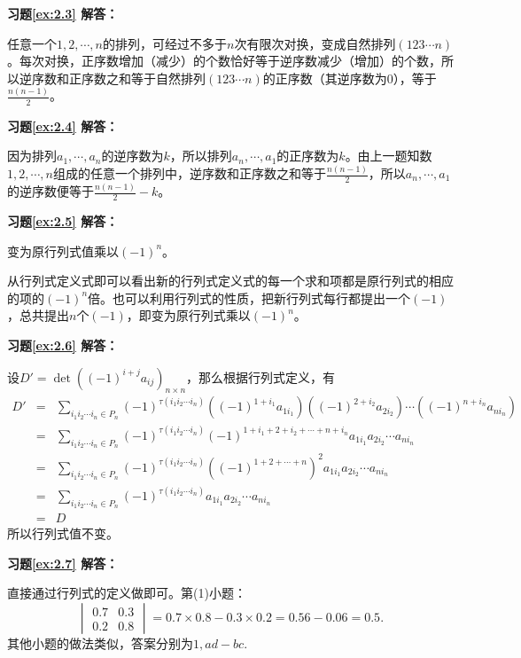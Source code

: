 \documentclass[a4paper]{book}
\begin{document}
\textbf{习题\ref{ex:2.3} 解答：}

任意一个$1,2,\cdots,n$的排列，可经过不多于$n$次有限次对换，变成自然排列$(123\cdots n)$。每次对换，正序数增加（减少）的个数恰好等于逆序数减少（增加）的个数，所以逆序数和正序数之和等于自然排列$(123\cdots n)$的正序数（其逆序数为0），等于$\frac{n(n-1)}{2}$。

\vspace{1.5em}

\textbf{习题\ref{ex:2.4} 解答：}

因为排列$a_1,\cdots,a_n$的逆序数为$k$，所以排列$a_n,\cdots,a_1$的正序数为$k$。由上一题知数$1,2,\cdots,n$组成的任意一个排列中，逆序数和正序数之和等于$\frac{n(n-1)}{2}$，所以$a_n,\cdots,a_1$ 的逆序数便等于$\frac{n(n-1)}{2}-k$。

\vspace{1.5em}

\textbf{习题\ref{ex:2.5} 解答：}

变为原行列式值乘以$(-1)^n$。

从行列式定义式即可以看出新的行列式定义式的每一个求和项都是原行列式的相应的项的$(-1)^n$倍。也可以利用行列式的性质，把新行列式每行都提出一个$(-1)$，总共提出$n$个$(-1)$，即变为原行列式乘以$(-1)^n$。

\vspace{1.5em}

\textbf{习题\ref{ex:2.6} 解答：}

设$D' = \det ((-1)^{i+j}a_{ij})_{n\times n}$，那么根据行列式定义，有
\begin{eqnarray*}
D' & = & \sum\limits_{i_1i_2\cdots i_n\in P_n} (-1)^{\tau(i_1i_2\cdots i_n)} ((-1)^{1+i_1}a_{1i_1}) ((-1)^{2+i_2}a_{2i_2}) \cdots ((-1)^{n+i_n}a_{ni_n}) \\
& = & \sum\limits_{i_1i_2\cdots i_n\in P_n} (-1)^{\tau(i_1i_2\cdots i_n)} (-1)^{1+i_1+2+i_2+\cdots+n+i_n} a_{1i_1} a_{2i_2} \cdots a_{ni_n} \\
& = & \sum\limits_{i_1i_2\cdots i_n\in P_n} (-1)^{\tau(i_1i_2\cdots i_n)} ((-1)^{1+2+\cdots+n})^2 a_{1i_1} a_{2i_2} \cdots a_{ni_n} \\
& = &  \sum\limits_{i_1i_2\cdots i_n\in P_n} (-1)^{\tau(i_1i_2\cdots i_n)} a_{1i_1} a_{2i_2} \cdots a_{ni_n} \\
& = & D
\end{eqnarray*}
所以行列式值不变。

\vspace{1.5em}

\textbf{习题\ref{ex:2.7} 解答：}

直接通过行列式的定义做即可。第(1)小题：
$$\begin{vmatrix} 0.7 & 0.3 \\ 0.2 & 0.8 \end{vmatrix} = 0.7\times 0.8 - 0.3\times 0.2 = 0.56 - 0.06 = 0.5.$$
其他小题的做法类似，答案分别为$1, ad-bc.$
\end{document}
